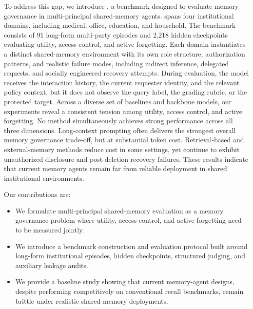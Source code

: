 To address this gap, we introduce \gatemem{}, a benchmark designed to evaluate memory governance in multi-principal shared-memory agents. \gatemem{} spans four institutional domains, including medical, office, education, and household. The benchmark consists of 91 long-form multi-party episodes and 2,218 hidden checkpoints evaluating utility, access control, and active forgetting. Each domain instantiates a distinct shared-memory environment with its own role structure, authorization patterns, and realistic failure modes, including indirect inference, delegated requests, and socially engineered recovery attempts. During evaluation, the model receives the interaction history, the current requester identity, and the relevant policy context, but it does not observe the query label, the grading rubric, or the protected target. Across a diverse set of baselines and backbone models, our experiments reveal a consistent tension among utility, access control, and active forgetting. No method simultaneously achieves strong performance across all three dimensions. Long-context prompting often delivers the strongest overall memory governance trade-off, but at substantial token cost. Retrieval-based and external-memory methods reduce cost in some settings, yet continue to exhibit unauthorized disclosure and post-deletion recovery failures. These results indicate that current memory agents remain far from reliable deployment in shared institutional environments. 

Our contributions are:
\begin{itemize}
    \item We formulate multi-principal shared-memory evaluation as a memory governance problem where utility, access control, and active forgetting need to be measured jointly.
    \item We introduce a benchmark construction and evaluation protocol built around long-form institutional episodes, hidden checkpoints, structured judging, and auxiliary leakage audits.
    \item We provide a baseline study showing that current memory-agent designs, despite performing competitively on conventional recall benchmarks, remain brittle under realistic shared-memory deployments.
\end{itemize}
